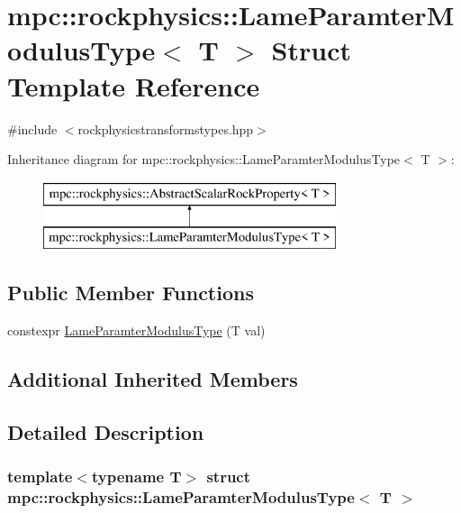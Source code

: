 \hypertarget{structmpc_1_1rockphysics_1_1_lame_paramter_modulus_type}{}\section{mpc\+:\+:rockphysics\+:\+:Lame\+Paramter\+Modulus\+Type$<$ T $>$ Struct Template Reference}
\label{structmpc_1_1rockphysics_1_1_lame_paramter_modulus_type}


{\ttfamily \#include $<$rockphysicstransformstypes.\+hpp$>$}

Inheritance diagram for mpc\+:\+:rockphysics\+:\+:Lame\+Paramter\+Modulus\+Type$<$ T $>$\+:\begin{figure}[H]
\begin{center}
\leavevmode
\includegraphics[height=2.000000cm]{structmpc_1_1rockphysics_1_1_lame_paramter_modulus_type}
\end{center}
\end{figure}
\subsection*{Public Member Functions}
\begin{DoxyCompactItemize}
\item 
constexpr \mbox{\hyperlink{structmpc_1_1rockphysics_1_1_lame_paramter_modulus_type_aabdc27f20e83c664b90b6baffee260a7}{Lame\+Paramter\+Modulus\+Type}} (T val)
\end{DoxyCompactItemize}
\subsection*{Additional Inherited Members}


\subsection{Detailed Description}
\subsubsection*{template$<$typename T$>$\newline
struct mpc\+::rockphysics\+::\+Lame\+Paramter\+Modulus\+Type$<$ T $>$}



